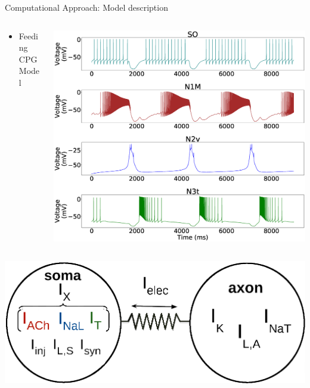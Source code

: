 \documentclass[aspectratio=43]{beamer}
\begin{document}
\begin{frame}{Computational Approach: Model description}
	\begin{columns}
		\begin{column}{0.6\textwidth}
			\begin{itemize}
				\item<1-> Feeding CPG Model
			\end{itemize}
		\end{column}
		\begin{column}{0.4\textwidth}
			\includegraphics[width=\textwidth]{methods/invariants-model/figure2.eps}
		\end{column}
	\end{columns}
		\includegraphics[width=\textwidth]{methods/invariants-model/figure1a.eps}
\end{frame}
\end{document}
